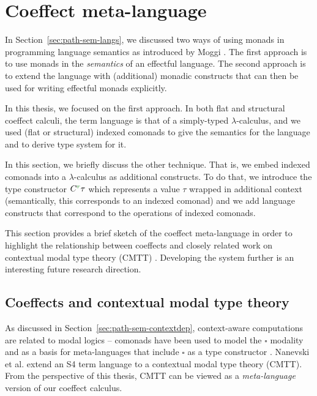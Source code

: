\section{Coeffect meta-language}
\label{sec:unified-meta} 

In Section~\ref{sec:path-sem-langs}, we discussed two ways of using monads in programming
language semantics as introduced by Moggi \cite{monad-notions}. The first approach is to use
monads in the \emph{semantics} of an effectful language. The second approach is to extend the
language with (additional) monadic constructs that can then be used for writing effectful
monads explicitly.

In this thesis, we focused on the first approach. In both flat and structural coeffect calculi,
the term language is that of a simply-typed $\lambda$-calculus, and we used (flat or structural)
indexed comonads to give the semantics for the language and to derive type system for it.

In this section, we briefly discuss the other technique. That is, we embed indexed
comonads into a $\lambda$-calculus as additional constructs. To do that, we introduce the
type constructor $\ctyp{\cclrd{r}}{\tau}$ which represents a value $\tau$ wrapped in additional
context (semantically, this corresponds to an indexed comonad) and we add language constructs
that correspond to the operations of indexed comonads.

This section provides a brief sketch of the coeffect meta-language in order to highlight the relationship
between coeffects and closely related work on contextual modal type theory (CMTT) \cite{logic-cmtt}.
Developing the system further is an interesting future research direction.


\subsection{Coeffects and contextual modal type theory}

As discussed in Section~\ref{sec:path-sem-contextdep}, context-aware computations are related
to modal logics -- comonads have been used to model the $\square$ modality and as a basis for
meta-languages that include $\square$ as a type constructor
\cite{logic-intuitionistic-modal,logic-modal-reconstruction,logic-intuitionistic-modal,logic-cmtt}.
Nanevski et al. \cite{logic-cmtt} extend an S4 term language to a contextual modal type theory (CMTT).
From the perspective of this thesis, CMTT can be viewed as a \emph{meta-language} version of our
coeffect calculus.


